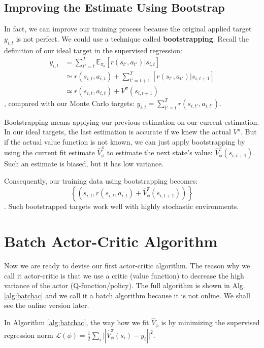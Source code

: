 \subsection{Improving the Estimate Using Bootstrap}
In fact, we can improve our training process because the original applied target $y_{i,t}$ is not perfect. We could use a technique called \textbf{bootstrapping}. Recall the definition of our ideal target in the supervised regression:
$$\begin{aligned}
    y_{i,t} &= \sum_{t'=t}^T\mathbb{E}_{\pi_\theta}\left[r(s_{t'},a_{t'})|s_{i,t}\right]\\
    & \simeq r(s_{i,t},a_{i,t})+\sum_{t'=t+1}^T\left[r(s_{t'},a_{t'})|s_{i,t+1}\right]\\
    & \simeq  r(s_{i,t},a_{i,t}) + V^\pi(s_{i,t+1})
\end{aligned}$$
, compared with our Monte Carlo targets: $y_{i,t} = \sum_{t'=t}^T r(s_{i,t'},a_{i,t'})$.

Bootstrapping means applying our previous estimation on our current estimation. In our ideal targets, the last estimation is accurate if we knew the actual $V^\pi$. But if the actual value function is not known, we can just apply bootstrapping by using the current fit estimate $\hat{V}^\pi_\phi$ to estimate the next state's value: $\hat{V}^\pi_\phi(s_{i,t+1})$. Such an estimate is biased, but it has low variance.

Consequently, our training data using bootstrapping becomes: \[\left\{(s_{i,t}, r(s_{i,t},a_{i,t}) +\hat{V}^\pi_\phi(s_{i,t+1})) \right\}\]. Such bootstrapped targets work well with highly stochastic environments. 

\section{Batch Actor-Critic Algorithm}
Now we are ready to devise our first actor-critic algorithm. The reason why we call it actor-critic is that we use a critic (value function) to decrease the high variance of the actor (Q-function/policy). The full algorithm is shown in Alg. \ref{alg:batchac} and we call it a batch algorithm because it is not online. We shall see the online version later.

In Algorithm \ref{alg:batchac}, the way how we fit $\hat{V}_\phi$ is by minimizing the supervised regression norm $\mathcal{L}(\phi) = \frac{1}{2}\sum_i\lvert|\hat{V}_\phi^\pi(s_i)-y_i|\rvert^2$.

